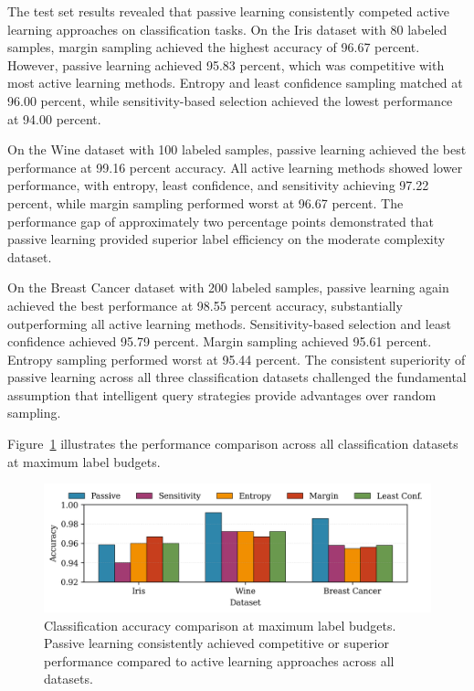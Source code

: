 \documentclass[conference]{IEEEtran}
\begin{document}
The test set results revealed that passive learning consistently competed active learning approaches on classification tasks. On the Iris dataset with 80 labeled samples, margin sampling achieved the highest accuracy of 96.67 percent. However, passive learning achieved 95.83 percent, which was competitive with most active learning methods. Entropy and least confidence sampling matched at 96.00 percent, while sensitivity-based selection achieved the lowest performance at 94.00 percent.

On the Wine dataset with 100 labeled samples, passive learning achieved the best performance at 99.16 percent accuracy. All active learning methods showed lower performance, with entropy, least confidence, and sensitivity achieving 97.22 percent, while margin sampling performed worst at 96.67 percent. The performance gap of approximately two percentage points demonstrated that passive learning provided superior label efficiency on the moderate complexity dataset.

On the Breast Cancer dataset with 200 labeled samples, passive learning again achieved the best performance at 98.55 percent accuracy, substantially outperforming all active learning methods. Sensitivity-based selection and least confidence achieved 95.79 percent. Margin sampling achieved 95.61 percent. Entropy sampling performed worst at 95.44 percent. The consistent superiority of passive learning across all three classification datasets challenged the fundamental assumption that intelligent query strategies provide advantages over random sampling.

Figure~\ref{fig:cls-comparison} illustrates the performance comparison across all classification datasets at maximum label budgets.

\begin{figure}[t]
\centering
\includegraphics[width=\columnwidth]{figures/cls_final_comparison.png}
\caption{Classification accuracy comparison at maximum label budgets. Passive learning consistently achieved competitive or superior performance compared to active learning approaches across all datasets.}
\label{fig:cls-comparison}
\end{figure}
\end{document}
